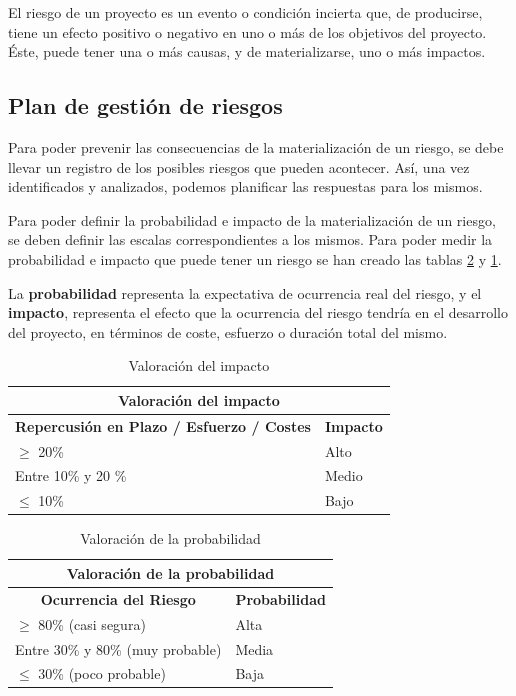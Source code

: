 El riesgo de un proyecto es un evento o condición incierta que, de producirse, tiene un efecto positivo o negativo en uno o más de los objetivos del proyecto. Éste, puede tener una o más causas, y de materializarse, uno o más impactos\cite{pmbok}.

\subsection{Plan de gestión de riesgos}
Para poder prevenir las consecuencias de la materialización de un riesgo, se debe llevar un registro de los posibles riesgos que pueden acontecer. Así, una vez identificados y analizados, podemos planificar las respuestas para los mismos.


Para poder definir la probabilidad e impacto de la materialización de un riesgo, se deben definir las escalas correspondientes a los mismos. Para poder medir la probabilidad e impacto que puede tener un riesgo se han creado las tablas \ref{tab_probabilidad} y \ref{tab_impacto}.


La \textbf{probabilidad} representa la expectativa de ocurrencia real del riesgo, y el \textbf{impacto}, representa el efecto que la ocurrencia del riesgo tendría en el desarrollo del proyecto, en términos de coste, esfuerzo o duración total del mismo. 

\begin{table}[htpb]
\centering
\begin{tabular}{|l|l|}
\hline
\multicolumn{2}{|c|}{\textbf{Valoración del impacto}}                                                  \\ \hline
\multicolumn{1}{|c|}{\textbf{Repercusión en Plazo / Esfuerzo / Costes}} & \multicolumn{1}{c|}{\textbf{Impacto}} \\ \hline
$\geq$ 20\%                                             & Alto                         \\ \hline
Entre 10\% y 20 \%                                             & Medio                        \\ \hline
$\leq$ 10\%                                                & Bajo                         \\ \hline
\end{tabular}
\caption{Valoración del impacto}
\label{tab_impacto}
\end{table}

\begin{table}[htpb]
\centering
\begin{tabular}{|l|l|}
\hline
\multicolumn{2}{|c|}{\textbf{Valoración de la probabilidad}} \\ \hline
\multicolumn{1}{|c|}{\textbf{Ocurrencia del Riesgo}}             & \multicolumn{1}{c|}{\textbf{Probabilidad}}  \\ \hline
$\geq$ 80\% (casi segura)  & Alta          \\ \hline
Entre 30\% y 80\% (muy probable)  & Media         \\ \hline
$\leq$ 30\% (poco probable)   & Baja         \\ \hline
\end{tabular}
\caption{Valoración de la probabilidad}
\label{tab_probabilidad}
\end{table}


